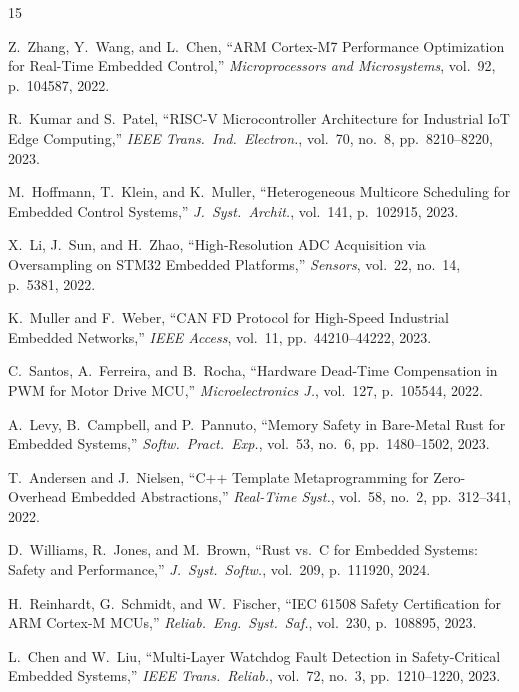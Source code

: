 \documentclass[12pt,a4paper]{article}
\begin{document}
\newpage
\begin{thebibliography}{15}

Z.~Zhang, Y.~Wang, and L.~Chen,
``ARM Cortex-M7 Performance Optimization for Real-Time Embedded
Control,''
\textit{Microprocessors and Microsystems}, vol.~92, p.~104587, 2022.

R.~Kumar and S.~Patel,
``RISC-V Microcontroller Architecture for Industrial IoT Edge
Computing,''
\textit{IEEE Trans.\ Ind.\ Electron.}, vol.~70, no.~8,
pp.~8210--8220, 2023.

M.~Hoffmann, T.~Klein, and K.~Muller,
``Heterogeneous Multicore Scheduling for Embedded Control Systems,''
\textit{J.\ Syst.\ Archit.}, vol.~141, p.~102915, 2023.

X.~Li, J.~Sun, and H.~Zhao,
``High-Resolution ADC Acquisition via Oversampling on STM32
Embedded Platforms,''
\textit{Sensors}, vol.~22, no.~14, p.~5381, 2022.

K.~Muller and F.~Weber,
``CAN FD Protocol for High-Speed Industrial Embedded Networks,''
\textit{IEEE Access}, vol.~11, pp.~44210--44222, 2023.

C.~Santos, A.~Ferreira, and B.~Rocha,
``Hardware Dead-Time Compensation in PWM for Motor Drive MCU,''
\textit{Microelectronics J.}, vol.~127, p.~105544, 2022.

A.~Levy, B.~Campbell, and P.~Pannuto,
``Memory Safety in Bare-Metal Rust for Embedded Systems,''
\textit{Softw.\ Pract.\ Exp.}, vol.~53, no.~6,
pp.~1480--1502, 2023.

T.~Andersen and J.~Nielsen,
``C++ Template Metaprogramming for Zero-Overhead Embedded
Abstractions,''
\textit{Real-Time Syst.}, vol.~58, no.~2, pp.~312--341, 2022.

D.~Williams, R.~Jones, and M.~Brown,
``Rust vs.\ C for Embedded Systems: Safety and Performance,''
\textit{J.\ Syst.\ Softw.}, vol.~209, p.~111920, 2024.

H.~Reinhardt, G.~Schmidt, and W.~Fischer,
``IEC 61508 Safety Certification for ARM Cortex-M MCUs,''
\textit{Reliab.\ Eng.\ Syst.\ Saf.}, vol.~230, p.~108895, 2023.

L.~Chen and W.~Liu,
``Multi-Layer Watchdog Fault Detection in Safety-Critical
Embedded Systems,''
\textit{IEEE Trans.\ Reliab.}, vol.~72, no.~3,
pp.~1210--1220, 2023.


\end{thebibliography}
\end{document}
